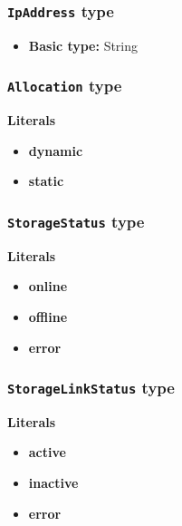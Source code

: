 \subsubsection{\texttt{IpAddress} type}

\begin{itemize}
\item \textbf{Basic type:} String
\end{itemize}
\subsubsection{\texttt{Allocation} type}

\textbf{Literals}
\begin{itemize}
\item \textbf{dynamic} 
\end{itemize}
\begin{itemize}
\item \textbf{static} 
\end{itemize}

\subsubsection{\texttt{StorageStatus} type}

\textbf{Literals}
\begin{itemize}
\item \textbf{online} 
\end{itemize}
\begin{itemize}
\item \textbf{offline} 
\end{itemize}
\begin{itemize}
\item \textbf{error} 
\end{itemize}

\subsubsection{\texttt{StorageLinkStatus} type}

\textbf{Literals}
\begin{itemize}
\item \textbf{active} 
\end{itemize}
\begin{itemize}
\item \textbf{inactive} 
\end{itemize}
\begin{itemize}
\item \textbf{error} 
\end{itemize}

